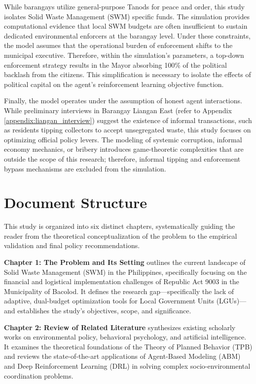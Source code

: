 While barangays utilize general-purpose Tanods for peace and order, this study isolates Solid Waste Management (SWM) specific funds. The simulation provides computational evidence that local SWM budgets are often insufficient to sustain dedicated environmental enforcers at the barangay level. Under these constraints, the model assumes that the operational burden of enforcement shifts to the municipal executive. Therefore, within the simulation's parameters, a top-down enforcement strategy results in the Mayor absorbing 100\% of the political backlash from the citizens. This simplification is necessary to isolate the effects of political capital on the agent's reinforcement learning objective function.

Finally, the model operates under the assumption of honest agent interactions. While preliminary interviews in Barangay Liangan East (refer to Appendix \ref{appendix:liangan_interview}) suggest the existence of informal transactions, such as residents tipping collectors to accept unsegregated waste, this study focuses on optimizing official policy levers. The modeling of systemic corruption, informal economy mechanics, or bribery introduces game-theoretic complexities that are outside the scope of this research; therefore, informal tipping and enforcement bypass mechanisms are excluded from the simulation.

\section{Document Structure}

This study is organized into six distinct chapters, systematically guiding the reader from the theoretical conceptualization of the problem to the empirical validation and final policy recommendations.

\textbf{Chapter 1: The Problem and Its Setting} outlines the current landscape of Solid Waste Management (SWM) in the Philippines, specifically focusing on the financial and logistical implementation challenges of Republic Act 9003 in the Municipality of Bacolod. It defines the research gap---specifically the lack of adaptive, dual-budget optimization tools for Local Government Units (LGUs)---and establishes the study's objectives, scope, and significance.

\textbf{Chapter 2: Review of Related Literature} synthesizes existing scholarly works on environmental policy, behavioral psychology, and artificial intelligence. It examines the theoretical foundations of the Theory of Planned Behavior (TPB) and reviews the state-of-the-art applications of Agent-Based Modeling (ABM) and Deep Reinforcement Learning (DRL) in solving complex socio-environmental coordination problems.

